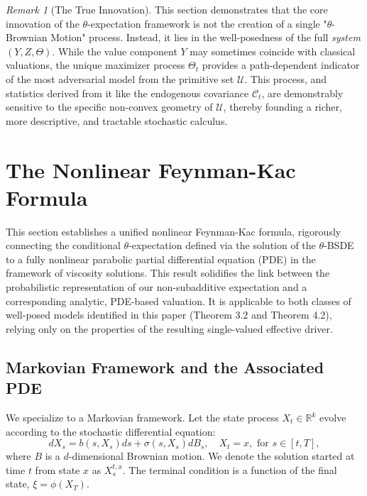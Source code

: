 \documentclass[12pt, letterpaper]{amsart}
\newcommand{\Ucal}{\mathcal{U}}
\newcommand{\R}{\mathbb{R}}
\theoremstyle{plain}
\theoremstyle{definition}
\theoremstyle{remark}
\newtheorem{remark}[theorem]{Remark}
\numberwithin{equation}{section} %
\begin{document}
\begin{remark}[The True Innovation]
This section demonstrates that the core innovation of the $\theta$-expectation framework is not the creation of a single "$\theta$-Brownian Motion" process. Instead, it lies in the well-posedness of the full \emph{system} $(Y,Z,\Theta)$. While the value component $Y$ may sometimes coincide with classical valuations, the unique maximizer process $\Theta_t$ provides a path-dependent indicator of the most adversarial model from the primitive set $\Ucal$. This process, and statistics derived from it like the endogenous covariance $\mathcal{C}_t$, are demonstrably sensitive to the specific non-convex geometry of $\Ucal$, thereby founding a richer, more descriptive, and tractable stochastic calculus.
\end{remark}


\section{The Nonlinear Feynman-Kac Formula}
\label{sec:feynman_kac}

This section establishes a unified nonlinear Feynman-Kac formula, rigorously connecting the conditional $\theta$-expectation defined via the solution of the $\theta$-BSDE to a fully nonlinear parabolic partial differential equation (PDE) in the framework of viscosity solutions. This result solidifies the link between the probabilistic representation of our non-subadditive expectation and a corresponding analytic, PDE-based valuation. It is applicable to both classes of well-posed models identified in this paper (Theorem 3.2 and Theorem 4.2), relying only on the properties of the resulting single-valued effective driver.

\subsection{Markovian Framework and the Associated PDE}
We specialize to a Markovian framework. Let the state process $X_t \in \R^k$ evolve according to the stochastic differential equation:
\begin{equation} \label{eq:sde_forward}
    dX_s = b(s, X_s) ds + \sigma(s, X_s) dB_s, \quad X_t = x, \text{ for } s \in [t,T],
\end{equation}
where $B$ is a $d$-dimensional Brownian motion. We denote the solution started at time $t$ from state $x$ as $X_s^{t,x}$. The terminal condition is a function of the final state, $\xi = \phi(X_T)$.
\end{document}
